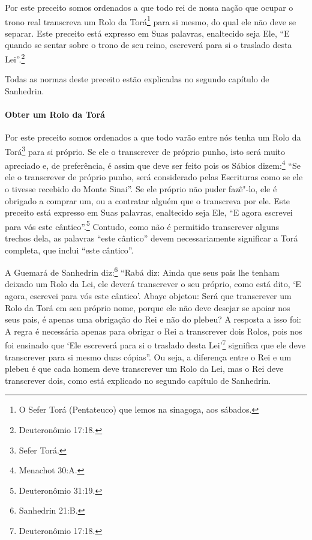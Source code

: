 \begin{multicols}{2}
Por este preceito somos ordenados a que todo rei de nossa nação que
ocupar o trono real transcreva um Rolo da Torá\starr\footnote{O Sefer Torá\starr{} (Pentateuco) que lemos na sinagoga, aos sábados.}
para si mesmo, do qual ele não deve se separar. Este preceito está
expresso em Suas palavras, enaltecido seja Ele, ``E quando se sentar
sobre o trono de seu reino, escreverá para si o traslado desta Lei''.\footnote{Deuteronômio 17:18.}

Todas as normas deste preceito estão explicadas no segundo capítulo de
Sanhedrin\starr.

\paragraph{Obter um Rolo da Torá\starr{}}

Por este preceito somos ordenados a que todo varão entre nós tenha um Rolo da Torá\starr\footnote{Sefer Torá\starr.} para si próprio. Se ele o transcrever de próprio punho, isto será muito apreciado e, de preferência, é assim que deve ser feito
pois os Sábios dizem:\footnote{Menachot\starr{} 30:A.} ``Se ele o transcrever de
próprio punho, será considerado pelas Escrituras como se ele o tivesse recebido do Monte Sinai''. Se ele
próprio não puder fazê"-lo, ele é obrigado a comprar um, ou a contratar
alguém que o transcreva por ele. Este preceito está expresso em Suas palavras,
enaltecido seja Ele, ``E agora escrevei para vós este cântico''.\footnote{Deuteronômio 31:19.} Contudo, como não é permitido transcrever alguns
trechos dela, as palavras ``este cântico'' devem necessariamente
significar a Torá\starr{} completa, que inclui ``este cântico''.

A Guemará\starr{} de Sanhedrin\starr{} diz:\footnote{Sanhedrin\starr{} 21:B.} ``Rabá\starr{} diz: Ainda que
seus pais lhe tenham deixado um Rolo da Lei, ele deverá transcrever o seu próprio,
como está dito, `E agora, escrevei para vós este cântico'. Abaye
objetou: Será que transcrever um Rolo da Torá\starr{} em seu próprio nome,
porque ele não deve desejar se apoiar nos seus pais, é apenas uma
obrigação do Rei e não do plebeu? A resposta a isso foi: A regra é
necessária apenas para obrigar o Rei a transcrever dois Rolos, pois nos
foi ensinado que `Ele escreverá para si o traslado desta Lei'\footnote{Deuteronômio 17:18.} significa que ele deve transcrever para si mesmo
duas cópias''. Ou seja, a diferença entre o Rei e um plebeu é que cada
homem deve transcrever um Rolo da Lei, mas o Rei deve transcrever dois,
como está explicado no segundo capítulo de Sanhedrin\starr.


\end{multicols}

